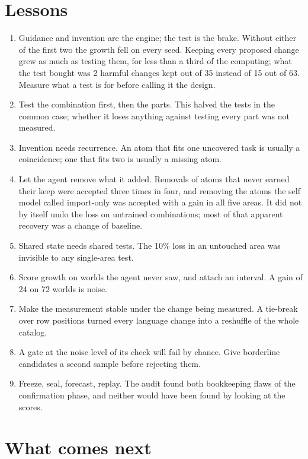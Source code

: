 \documentclass[11pt]{article}
\begin{document}
\section{Lessons}

\begin{enumerate}[leftmargin=*]
\item Guidance and invention are the engine; the test is the brake. Without either of the first two the growth fell on every seed. Keeping every proposed change grew as much as testing them, for less than a third of the computing; what the test bought was 2 harmful changes kept out of 35 instead of 15 out of 63. Measure what a test is for before calling it the design.
\item Test the combination first, then the parts. This halved the tests in the common case; whether it loses anything against testing every part was not measured.
\item Invention needs recurrence. An atom that fits one uncovered task is usually a coincidence; one that fits two is usually a missing atom.
\item Let the agent remove what it added. Removals of atoms that never earned their keep were accepted three times in four, and removing the atoms the self model called import-only was accepted with a gain in all five areas. It did not by itself undo the loss on untrained combinations; most of that apparent recovery was a change of baseline.
\item Shared state needs shared tests. The 10\% loss in an untouched area was invisible to any single-area test.
\item Score growth on worlds the agent never saw, and attach an interval. A gain of 24 on 72 worlds is noise.
\item Make the measurement stable under the change being measured. A tie-break over row positions turned every language change into a reshuffle of the whole catalog.
\item A gate at the noise level of its check will fail by chance. Give borderline candidates a second sample before rejecting them.
\item Freeze, seal, forecast, replay. The audit found both bookkeeping flaws of the confirmation phase, and neither would have been found by looking at the scores.
\end{enumerate}

\section{What comes next}
\end{document}
